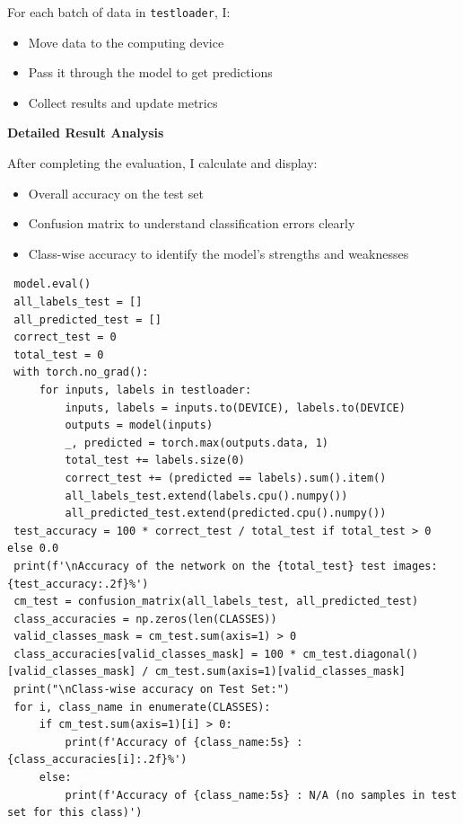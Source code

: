 \documentclass[12pt, a4paper, openany]{report}
\begin{document}
 For each batch of data in \texttt{testloader}, I:
 \begin{itemize}
     \item Move data to the computing device %
     \item Pass it through the model to get predictions %
     \item Collect results and update metrics %
 \end{itemize}

 \textbf{Detailed Result Analysis} %

 After completing the evaluation, I calculate and display:
 \begin{itemize}
     \item Overall accuracy on the test set %
     \item Confusion matrix to understand classification errors clearly %
     \item Class-wise accuracy to identify the model's strengths and weaknesses %
 \end{itemize}

 \begin{verbatim}
 model.eval()
 all_labels_test = []
 all_predicted_test = []
 correct_test = 0
 total_test = 0
 with torch.no_grad():
     for inputs, labels in testloader:
         inputs, labels = inputs.to(DEVICE), labels.to(DEVICE)
         outputs = model(inputs)
         _, predicted = torch.max(outputs.data, 1)
         total_test += labels.size(0)
         correct_test += (predicted == labels).sum().item()
         all_labels_test.extend(labels.cpu().numpy())
         all_predicted_test.extend(predicted.cpu().numpy())
 test_accuracy = 100 * correct_test / total_test if total_test > 0 else 0.0
 print(f'\nAccuracy of the network on the {total_test} test images: {test_accuracy:.2f}%')
 cm_test = confusion_matrix(all_labels_test, all_predicted_test)
 class_accuracies = np.zeros(len(CLASSES))
 valid_classes_mask = cm_test.sum(axis=1) > 0
 class_accuracies[valid_classes_mask] = 100 * cm_test.diagonal()[valid_classes_mask] / cm_test.sum(axis=1)[valid_classes_mask]
 print("\nClass-wise accuracy on Test Set:")
 for i, class_name in enumerate(CLASSES):
     if cm_test.sum(axis=1)[i] > 0:
         print(f'Accuracy of {class_name:5s} : {class_accuracies[i]:.2f}%')
     else:
         print(f'Accuracy of {class_name:5s} : N/A (no samples in test set for this class)')
 \end{verbatim}
\end{document}
